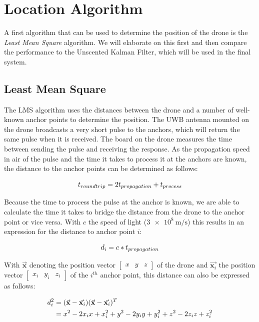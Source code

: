 \documentclass[a4paper]{article}        %
\begin{document}
\section{Location Algorithm}
	A first algorithm that can be used to determine the position of the drone is the \textit{Least Mean Square} algorithm. We will elaborate on this first and then compare the performance to the Unscented Kalman Filter, which will be used in the final system. 

	\subsection{Least Mean Square}
	\label{subsec:LMS}

		The LMS algorithm uses the distances between the drone and a number of well-known anchor points to determine the position. The UWB antenna mounted on the drone broadcasts a very short pulse to the anchors, which will return the same pulse when it is received. The board on the drone measures the time between sending the pulse and receiving the response. As the propagation speed in air of the pulse and the time it takes to process it at the anchors are known, the distance to the anchor points can be determined as follows:

		\begin{equation}
		\centering
			t_{roundtrip} = 2t_{propagation} + t_{process}
		\end{equation} 

		Because the time to process the pulse at the anchor is known, we are able to calculate the time it takes to bridge the distance from the drone to the anchor point or vice versa. With $c$ the speed of light ($\SI{3e8}{\meter\per\second}$) this results in an expression for the distance to anchor point $i$:

		\begin{equation}
		\centering
			d_i = c*t_{propagation}
		\end{equation}

		With $\vec{\textbf{x}}$ denoting the position vector $\begin{bmatrix} x & y & z \end{bmatrix}$ of the drone and $\vec{\textbf{x}_i}$ the position vector $\begin{bmatrix} x_i & y_i & z_i \end{bmatrix}$ of the $i^{th}$ anchor point, this distance can also be expressed as follows:

		\begin{align*}
		\centering
			d_i^2 &= (\vec{\textbf{x}} - \vec{\textbf{x}_i})(\vec{\textbf{x}} - \vec{\textbf{x}_i})^T \\
			&= x^2 - 2x_ix + x_i^2 + y^2 - 2y_iy + y_i^2 + z^2 - 2z_iz + z_i^2
		\end{align*}
\end{document}
